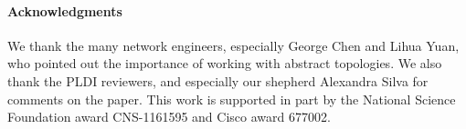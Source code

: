 \documentclass[numbers, 10pt]{sigplanconf}
\newcommand{\para}[1]{\paragraph*{\textbf{#1}}}
\begin{document}
\para{Acknowledgments}
We thank the many network engineers, especially George Chen and Lihua Yuan, who pointed out the importance of working with abstract topologies. 
We also thank the PLDI reviewers, and especially our shepherd Alexandra Silva for comments on the paper. This work is supported in part by the National Science Foundation award CNS-1161595 and Cisco award 677002.


%
%
%
%

\balance






%
%
%
%
\end{document}
